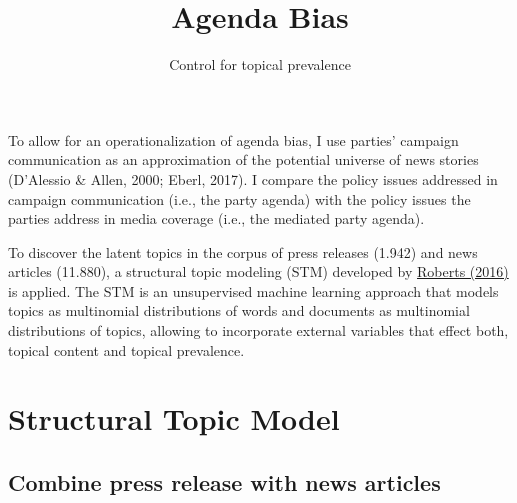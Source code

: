 \documentclass[]{article}
\title{Agenda Bias}
\subtitle{Control for topical prevalence}
\author{}
\date{}
\newenvironment{Shaded}{\begin{snugshade}}{\end{snugshade}}
\newcommand{\KeywordTok}[1]{\textcolor[rgb]{0.13,0.29,0.53}{\textbf{#1}}}
\newcommand{\DataTypeTok}[1]{\textcolor[rgb]{0.13,0.29,0.53}{#1}}
\newcommand{\StringTok}[1]{\textcolor[rgb]{0.31,0.60,0.02}{#1}}
\newcommand{\OperatorTok}[1]{\textcolor[rgb]{0.81,0.36,0.00}{\textbf{#1}}}
\newcommand{\NormalTok}[1]{#1}
\begin{document}
\maketitle

To allow for an operationalization of agenda bias, I use parties'
campaign communication as an approximation of the potential universe of
news stories (D'Alessio \& Allen, 2000; Eberl, 2017). I compare the
policy issues addressed in campaign communication (i.e., the party
agenda) with the policy issues the parties address in media coverage
(i.e., the mediated party agenda).

To discover the latent topics in the corpus of press releases (1.942)
and news articles (11.880), a structural topic modeling (STM) developed
by
\href{https://scholar.princeton.edu/sites/default/files/bstewart/files/a_model_of_text_for_experimentation_in_the_social_sciences.pdf}{Roberts
(2016)} is applied. The STM is an unsupervised machine learning approach
that models topics as multinomial distributions of words and documents
as multinomial distributions of topics, allowing to incorporate external
variables that effect both, topical content and topical prevalence.

\section{Structural Topic Model}\label{structural-topic-model}

\subsection{Combine press release with news
articles}\label{combine-press-release-with-news-articles}

\begin{Shaded}
\end{Shaded}
\end{document}
